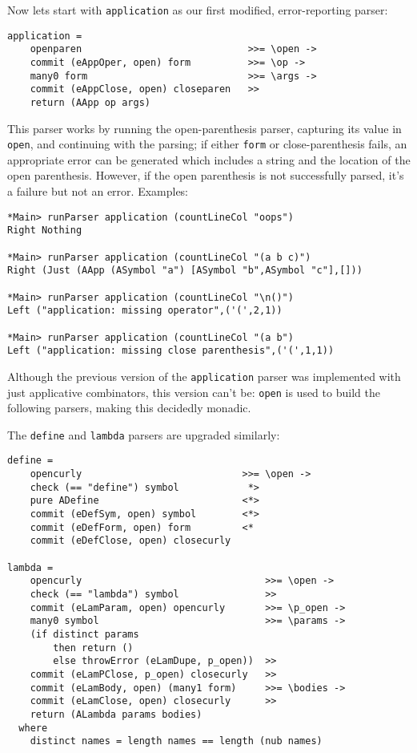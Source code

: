 \documentclass{tmr}
\begin{document}
Now lets start with \verb+application+ as our first modified, error-reporting parser:
\begin{verbatim}
application =
    openparen                             >>= \open ->
    commit (eAppOper, open) form          >>= \op ->
    many0 form                            >>= \args ->
    commit (eAppClose, open) closeparen   >>
    return (AApp op args)
\end{verbatim}
This parser works by running the open-parenthesis parser, capturing its value 
in \verb+open+, and continuing with the parsing; if either \verb+form+ or 
close-parenthesis fails, an appropriate error can be generated which includes 
a string and the location of the open parenthesis.  However, if the open 
parenthesis is not successfully parsed, it's a failure but not an error.  
Examples:
\begin{verbatim}
*Main> runParser application (countLineCol "oops")
Right Nothing

*Main> runParser application (countLineCol "(a b c)")
Right (Just (AApp (ASymbol "a") [ASymbol "b",ASymbol "c"],[]))

*Main> runParser application (countLineCol "\n()")
Left ("application: missing operator",('(',2,1))

*Main> runParser application (countLineCol "(a b")
Left ("application: missing close parenthesis",('(',1,1))
\end{verbatim}

Although the previous version of the \verb+application+ parser was implemented 
with just applicative combinators, this version can't be:  \verb+open+ 
is used to build the following parsers, making this decidedly monadic.

The \verb+define+ and \verb+lambda+ parsers are upgraded similarly:
\begin{verbatim}
define =
    opencurly                            >>= \open ->
    check (== "define") symbol            *>
    pure ADefine                         <*>
    commit (eDefSym, open) symbol        <*>
    commit (eDefForm, open) form         <*
    commit (eDefClose, open) closecurly  

lambda =
    opencurly                                >>= \open ->
    check (== "lambda") symbol               >>
    commit (eLamParam, open) opencurly       >>= \p_open ->
    many0 symbol                             >>= \params ->
    (if distinct params 
        then return ()
        else throwError (eLamDupe, p_open))  >>
    commit (eLamPClose, p_open) closecurly   >>
    commit (eLamBody, open) (many1 form)     >>= \bodies ->
    commit (eLamClose, open) closecurly      >>
    return (ALambda params bodies)
  where
    distinct names = length names == length (nub names)
\end{verbatim}
\end{document}
